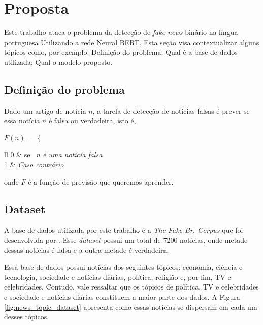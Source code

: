 \section{Proposta}


Este trabalho ataca o problema da detecção de \textit{fake news} binário na língua portuguesa Utilizando a rede Neural BERT. Esta seçâo visa contextualizar alguns tópicos como, por exemplo: Definiçâo do problema; Qual é a base de dados utilizada; Qual o modelo proposto.






\subsection{Definição do problema}

Dado um artigo de notícia $n$, a tarefa de detecção de notícias falsas é prever se essa notícia $n$ é falsa ou verdadeira, isto é,

\begin{center}
    $F(n) =$
    \left\{
    	\begin{array}{ll}
    		0  & \mbox{se } \textit{n é uma notícia falsa} \\
    		1 & \textit{Caso contrário}
    	\end{array}
   
\end{center}

onde $F$ é a função de previsão que queremos aprender.

\subsection{Dataset}

A base de dados utilizada por este trabalho é a \textit{The Fake Br. Corpus}  que foi desenvolvida por \citet{Silva2020}. Esse \textit{dataset} possui um total de 7200 notícias, onde metade dessas notícias é falsa e a outra metade é verdadeira. 

Essa base de dados possui notícias dos seguintes tópicos: economia, ciência e tecnologia, sociedade e notícias diárias, política, religião e, por fim, TV e celebridades. Contudo, vale ressaltar que os tópicos de política, TV e celebridades e sociedade e notícias diárias constituem a maior parte dos dados. A Figura \ref{fig:news_topic_dataset} apresenta como essas notícias se dispersam em cada um desses tópicos. 


